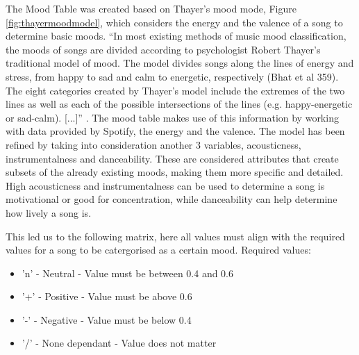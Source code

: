 \documentclass[10pt, notitlepage]{report}
\begin{document}
The Mood Table was created based on Thayer’s mood mode, Figure \ref{fig:thayermoodmodel}, which considers the energy and the valence of a song to determine basic moods. “In most existing methods of music mood classification, the moods of songs are divided according to psychologist Robert Thayer’s traditional model of mood. The model divides songs along the lines of energy and stress, from happy to sad and calm to energetic, respectively (Bhat et al 359). The eight categories created by Thayer’s model include the extremes of the two lines as well as each of the possible intersections of the lines (e.g. happy-energetic or sad-calm). [...]” \cite{Nuzzolo2015}. The mood table makes use of this information by working with data provided by Spotify, the energy and the valence. The model has been refined by taking into consideration another 3 variables, acousticness, instrumentalness and danceability. These are considered attributes that create subsets of the already existing moods, making them more specific and detailed. High acousticness and instrumentalness can be used to determine a song is motivational or good for concentration, while danceability can help determine how lively a song is. 

This led us to the following matrix, here all values must align with the required values for a song to be catergorised as a certain mood.
Required values:
\begin{itemize}
\item 'n' - Neutral - Value must be between 0.4 and 0.6
\item '+' - Positive - Value must be above 0.6
\item '-' - Negative - Value must be below 0.4
\item '/' - None dependant - Value does not matter
\end{itemize} 
\end{document}
